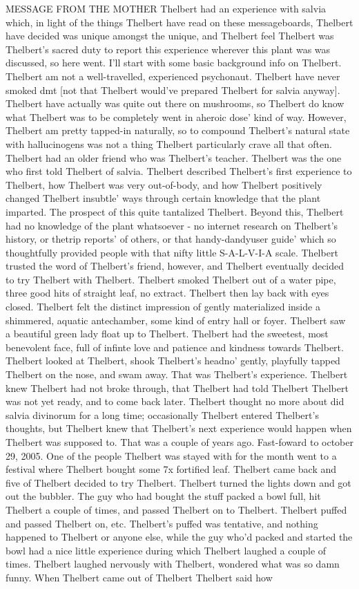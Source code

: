 \documentclass[12pt]{book}
\begin{document}
MESSAGE FROM THE MOTHER Thelbert had an experience with salvia which, in light of the things Thelbert have read on these messageboards, Thelbert have decided was unique amongst the unique, and Thelbert feel Thelbert was Thelbert's sacred duty to report this experience wherever this plant was was discussed, so here went. I'll start with some basic background info on Thelbert. Thelbert am not a well-travelled, experienced psychonaut. Thelbert have never smoked dmt [not that Thelbert would've prepared Thelbert for salvia anyway]. Thelbert have actually was quite out there on mushrooms, so Thelbert do know what Thelbert was to be completely went in aheroic dose' kind of way. However, Thelbert am pretty tapped-in naturally, so to compound Thelbert's natural state with hallucinogens was not a thing Thelbert particularly crave all that often. Thelbert had an older friend who was Thelbert's teacher. Thelbert was the one who first told Thelbert of salvia. Thelbert described Thelbert's first experience to Thelbert, how Thelbert was very out-of-body, and how Thelbert positively changed Thelbert insubtle' ways through certain knowledge that the plant imparted. The prospect of this quite tantalized Thelbert. Beyond this, Thelbert had no knowledge of the plant whatsoever - no internet research on Thelbert's history, or thetrip reports' of others, or that handy-dandyuser guide' which so thoughtfully provided people with that nifty little S-A-L-V-I-A scale. Thelbert trusted the word of Thelbert's friend, however, and Thelbert eventually decided to try Thelbert with Thelbert. Thelbert smoked Thelbert out of a water pipe, three good hits of straight leaf, no extract. Thelbert then lay back with eyes closed. Thelbert felt the distinct impression of gently materialized inside a shimmered, aquatic antechamber, some kind of entry hall or foyer. Thelbert saw a beautiful green lady float up to Thelbert. Thelbert had the sweetest, most benevolent face, full of infinte love and patience and kindness towards Thelbert. Thelbert looked at Thelbert, shook Thelbert's headno' gently, playfully tapped Thelbert on the nose, and swam away. That was Thelbert's experience. Thelbert knew Thelbert had not broke through, that Thelbert had told Thelbert Thelbert was not yet ready, and to come back later. Thelbert thought no more about did salvia divinorum for a long time; occasionally Thelbert entered Thelbert's thoughts, but Thelbert knew that Thelbert's next experience would happen when Thelbert was supposed to. That was a couple of years ago. Fast-foward to october 29, 2005. One of the people Thelbert was stayed with for the month went to a festival where Thelbert bought some 7x fortified leaf. Thelbert came back and five of Thelbert decided to try Thelbert. Thelbert turned the lights down and got out the bubbler. The guy who had bought the stuff packed a bowl full, hit Thelbert a couple of times, and passed Thelbert on to Thelbert. Thelbert puffed and passed Thelbert on, etc. Thelbert's puffed was tentative, and nothing happened to Thelbert or anyone else, while the guy who'd packed and started the bowl had a nice little experience during which Thelbert laughed a couple of times. Thelbert laughed nervously with Thelbert, wondered what was so damn funny. When Thelbert came out of Thelbert Thelbert said how 
\end{document}
